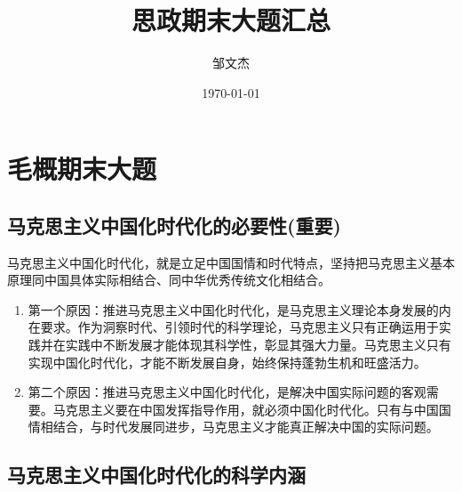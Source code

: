 \documentclass[12pt, a4paper, oneside]{ctexbook}
\title{{\Huge{\textbf{思政期末大题汇总}}}}
\author{邹文杰}
\date{\today}
\begin{document}
\maketitle

\setcounter{page}{1}




{}
\setcounter{page}{1}
\tableofcontents
\newpage
\setcounter{page}{1}

\chapter{毛概期末大题}

\section{马克思主义中国化时代化的必要性(重要)}

马克思主义中国化时代化，就是立足中国国情和时代特点，坚持把马克思主义基本原理同中国具体实际相结合、同中华优秀传统文化相结合。

\begin{enumerate}[label=（\arabic*）]
\item 第一个原因：推进马克思主义中国化时代化，是马克思主义理论本身发展的内在要求。作为洞察时代、引领时代的科学理论，马克思主义只有正确运用于实践并在实践中不断发展才能体现其科学性，彰显其强大力量。马克思主义只有实现中国化时代化，才能不断发展自身，始终保持蓬勃生机和旺盛活力。
\item 第二个原因：推进马克思主义中国化时代化，是解决中国实际问题的客观需要。马克思主义要在中国发挥指导作用，就必须中国化时代化。只有与中国国情相结合，与时代发展同进步，马克思主义才能真正解决中国的实际问题。
\end{enumerate}

\section{马克思主义中国化时代化的科学内涵}
\end{document}
